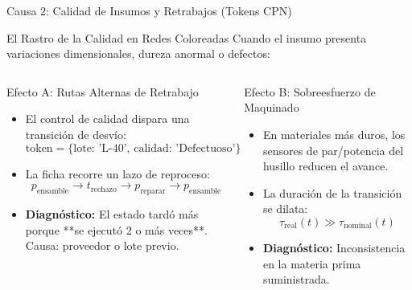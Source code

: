 \documentclass[10pt, aspectratio=169]{beamer}
\begin{document}
\begin{frame}{Causa 2: Calidad de Insumos y Retrabajos (Tokens CPN)}
	\begin{block}{El Rastro de la Calidad en Redes Coloreadas}
		Cuando el insumo presenta variaciones dimensionales, dureza anormal o defectos:
	\end{block}

	\begin{columns}
		\begin{block}{Efecto A: Rutas Alternas de Retrabajo}
			\begin{itemize}
				\item El control de calidad dispara una transición de desvío:
				\[ \text{token} = \{ \text{lote: } \text{'L-40'}, \, \text{calidad: } \text{'Defectuoso'} \} \]
				\item La ficha recorre un lazo de reproceso:
				\[ p_{\text{ensamble}} \to t_{\text{rechazo}} \to p_{\text{reparar}} \to p_{\text{ensamble}} \]
				\item \textbf{Diagnóstico:} El estado tardó más porque **se ejecutó 2 o más veces**. Causa: proveedor o lote previo.
			\end{itemize}
		\end{block}

		\begin{block}{Efecto B: Sobreesfuerzo de Maquinado}
			\begin{itemize}
				\item En materiales más duros, los sensores de par/potencia del husillo reducen el avance.
				\item La duración de la transición se dilata:
				\[ \tau_{\text{real}}(t) \gg \tau_{\text{nominal}}(t) \]
				\item \textbf{Diagnóstico:} Inconsistencia en la materia prima suministrada.
			\end{itemize}
		\end{block}
	\end{columns}
\end{frame}
\end{document}
